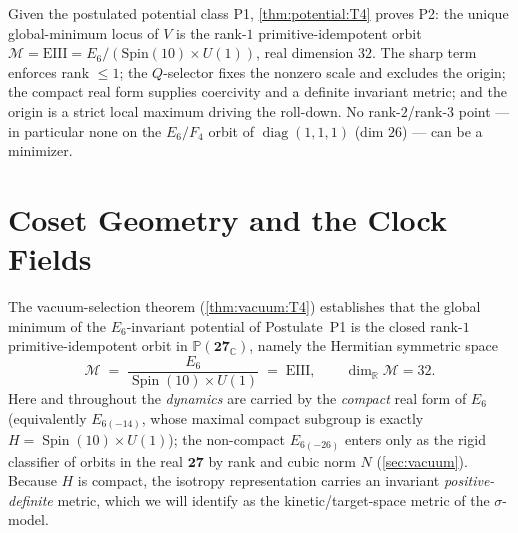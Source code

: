 \documentclass[11pt]{article}
\theoremstyle{plain}
\theoremstyle{definition}
\theoremstyle{remark}
\providecommand{\cref}[1]{\autoref{#1}}
\newcommand{\Spin}{\operatorname{Spin}}
\begin{document}
Given the postulated potential class P1, \autoref{thm:potential:T4} proves P2: the unique
global-minimum locus of $V$ is the rank-$1$ primitive-idempotent orbit
$\mathcal M=\mathrm{EIII}=E_6/(\mathrm{Spin}(10)\times U(1))$, real dimension $32$. The sharp
term enforces rank $\le1$; the $Q$-selector fixes the nonzero scale and excludes the origin;
the compact real form supplies coercivity and a definite invariant metric; and the origin is
a strict local maximum driving the roll-down. No rank-$2$/rank-$3$ point --- in particular
none on the $E_6/F_4$ orbit of $\operatorname{diag}(1,1,1)$ (dim $26$) --- can be a minimizer.


\section{Coset Geometry and the Clock Fields}
\label{sec:coset:main}
\label{sec:foundations:coset}
\label{sec:foundation:tangent}

The vacuum-selection theorem (\autoref{thm:vacuum:T4}) establishes that the
global minimum of the $E_{6}$-invariant potential of Postulate~P1 is the closed
rank-$1$ primitive-idempotent orbit in $\mathbb P(\mathbf{27}_{\mathbb C})$, namely
the Hermitian symmetric space
\begin{equation}\label{eq:coset:vacuum}
  \mathcal M \;=\; \frac{E_{6}}{\Spin(10)\times U(1)} \;=\; \mathrm{EIII},
  \qquad \dim_{\mathbb R}\mathcal M = 32 .
\end{equation}
Here and throughout the \emph{dynamics} are carried by the \emph{compact} real
form of $E_{6}$ (equivalently $E_{6(-14)}$, whose maximal compact subgroup is
exactly $H = \Spin(10)\times U(1)$); the non-compact $E_{6(-26)}$ enters only as
the rigid classifier of orbits in the real $\mathbf{27}$ by rank and cubic norm
$N$ (\autoref{sec:vacuum}). Because $H$ is compact, the isotropy
representation carries an invariant \emph{positive-definite} metric, which we
will identify as the kinetic/target-space metric of the $\sigma$-model.
\end{document}
